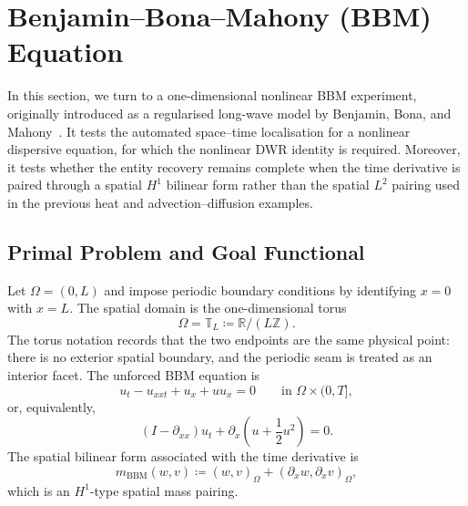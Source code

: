 \section{Benjamin--Bona--Mahony (BBM) Equation}
\label{sec:bbm-experiment}

In this section, we turn to a one-dimensional nonlinear BBM experiment, originally introduced as a regularised long-wave model by Benjamin, Bona, and Mahony~\cite{BBM}. It tests the automated space--time localisation for a nonlinear dispersive equation, for which the nonlinear DWR identity is required. Moreover, it tests whether the entity recovery remains complete when the time derivative is paired through a spatial $H^1$ bilinear form rather than the spatial $L^2$ pairing used in the previous heat and advection--diffusion examples.


\subsection{Primal Problem and Goal Functional}

Let $\Omega=(0,L)$ and impose periodic boundary conditions by identifying $x=0$ with $x=L$. The spatial domain is the one-dimensional torus
\[
  \Omega = \mathbb T_L\coloneqq\mathbb R/(L\mathbb Z).
  \label{eq:bbm-periodic-domain}
\]
The torus notation records that the two endpoints are the same physical point: there is no exterior spatial boundary, and the periodic seam is treated as an interior facet. The unforced BBM equation is
\begin{equation}
  u_t-u_{xxt}+u_x+u u_x=0
  \qquad\text{in }\Omega\times(0,T],
  \label{eq:bbm-strong}
\end{equation}
or, equivalently,
\begin{equation}
  (I-\partial_{xx})u_t
  +\partial_x\left(u+\frac12u^2\right)=0.
  \label{eq:bbm-conservative}
\end{equation}
The spatial bilinear form associated with the time derivative is
\begin{equation}
  m_{\mathrm{BBM}}(w,v)
  \coloneqq(w,v)_\Omega+(\partial_xw,\partial_xv)_\Omega,
  \label{eq:bbm-h1-mass}
\end{equation}
which is an $H^1$-type spatial mass pairing. 


